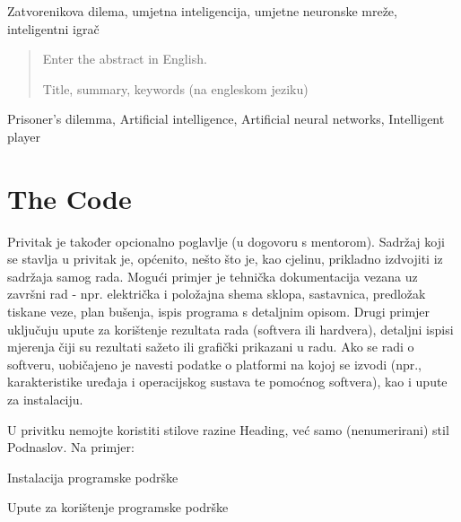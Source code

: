 \documentclass[zavrsnirad]{fer}
\begin{document}
\begin{kljucnerijeci}
	Zatvorenikova dilema, umjetna inteligencija, umjetne neuronske mreže, inteligentni igrač
\end{kljucnerijeci}


\begin{abstract}
  Enter the abstract in English.
  
  Title, summary, keywords (na engleskom jeziku)
  
\end{abstract}

\begin{keywords}
  Prisoner's dilemma, Artificial intelligence, Artificial neural networks, Intelligent player
\end{keywords}



\backmatter

\chapter{The Code}

	Privitak je također opcionalno poglavlje (u dogovoru s mentorom). 
	Sadržaj koji se stavlja u privitak je, općenito, nešto što je, kao cjelinu, prikladno izdvojiti iz sadržaja samog rada.
	Mogući primjer je tehnička dokumentacija vezana uz završni rad - npr. električka i položajna shema sklopa, sastavnica, predložak tiskane veze, plan bušenja, ispis programa s detaljnim opisom.
	Drugi primjer uključuju upute za korištenje rezultata rada (softvera ili hardvera), detaljni ispisi mjerenja čiji su rezultati sažeto ili grafički prikazani u radu. Ako se radi o softveru, uobičajeno je navesti podatke o platformi na kojoj se izvodi (npr., karakteristike uređaja i operacijskog sustava te pomoćnog softvera), kao i upute za instalaciju. 
	
	U privitku nemojte koristiti stilove razine Heading, već samo (nenumerirani) stil Podnaslov. 
	Na primjer:
	
	Instalacija programske podrške
	
	Upute za korištenje programske podrške


\end{document}
